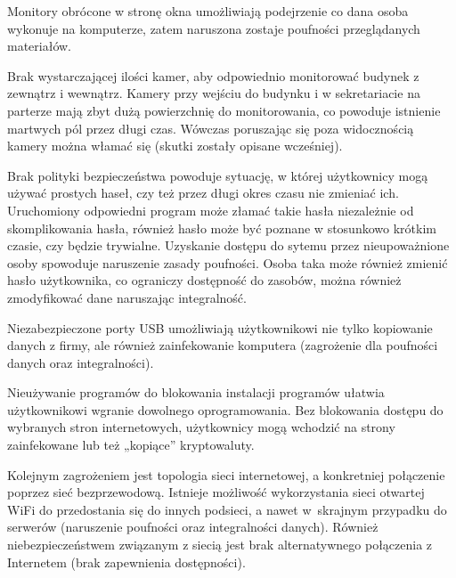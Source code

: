 Monitory obrócone w stronę okna umożliwiają podejrzenie co dana osoba wykonuje na komputerze, zatem naruszona zostaje poufności przeglądanych materiałów.

Brak wystarczającej ilości kamer, aby odpowiednio monitorować budynek z zewnątrz i wewnątrz. Kamery przy wejściu do budynku i w sekretariacie na parterze mają zbyt dużą powierzchnię do monitorowania, co powoduje istnienie martwych pól przez długi czas. Wówczas poruszając się poza widocznością kamery można włamać się (skutki zostały opisane wcześniej).  

Brak polityki bezpieczeństwa powoduje sytuację, w której użytkownicy mogą używać prostych haseł, czy też przez długi okres czasu nie zmieniać ich. Uruchomiony odpowiedni program może złamać takie hasła niezależnie od skomplikowania hasła, również hasło może być poznane w stosunkowo krótkim czasie, czy będzie trywialne. Uzyskanie dostępu do sytemu przez nieupoważnione osoby spowoduje naruszenie zasady poufności. Osoba taka może również zmienić hasło użytkownika, co ograniczy dostępność do zasobów, można również zmodyfikować dane naruszając integralność.

Niezabezpieczone porty USB umożliwiają użytkownikowi nie tylko kopiowanie danych z firmy, ale również zainfekowanie komputera (zagrożenie dla poufności danych oraz integralności).  

Nieużywanie programów do blokowania instalacji programów ułatwia użytkownikowi wgranie dowolnego oprogramowania. Bez blokowania  dostępu do wybranych stron internetowych, użytkownicy mogą wchodzić na strony zainfekowane lub też „kopiące” kryptowaluty.

Kolejnym zagrożeniem jest topologia sieci internetowej, a konkretniej połączenie poprzez sieć bezprzewodową. Istnieje możliwość wykorzystania sieci otwartej WiFi do przedostania się do innych podsieci, a nawet \linebreak w~skrajnym przypadku do serwerów (naruszenie poufności oraz integralności danych). Również niebezpieczeństwem \linebreak związanym z siecią jest brak alternatywnego połączenia z Internetem (brak zapewnienia dostępności).

% 
